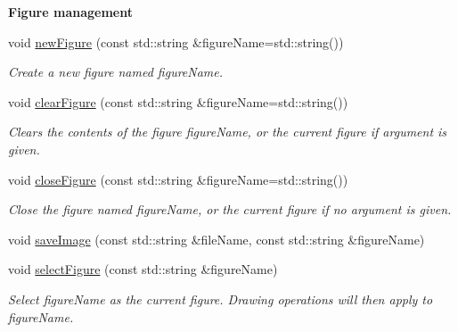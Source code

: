 \begin{Indent}\textbf{ Figure management}\par
\begin{DoxyCompactItemize}
\item 
void \hyperlink{group__figure_ga70a27a814768ac217e8323cb887f29a4}{new\+Figure} (const std\+::string \&figure\+Name=std\+::string())
\begin{DoxyCompactList}\small\item\em Create a new figure named {\itshape figure\+Name}. \end{DoxyCompactList}\item 
void \hyperlink{group__figure_ga4ff3b03be962d7ceba1062def0f557ef}{clear\+Figure} (const std\+::string \&figure\+Name=std\+::string())
\begin{DoxyCompactList}\small\item\em Clears the contents of the figure {\itshape figure\+Name}, or the current figure if argument is given. \end{DoxyCompactList}\item 
void \hyperlink{group__figure_gaa4bf32f16605010080edaea2437abb57}{close\+Figure} (const std\+::string \&figure\+Name=std\+::string())
\begin{DoxyCompactList}\small\item\em Close the figure named {\itshape figure\+Name}, or the current figure if no argument is given. \end{DoxyCompactList}\item 
void \hyperlink{group__figure_gab6e221be3af71ea2286aecd0f7768908}{save\+Image} (const std\+::string \&file\+Name, const std\+::string \&figure\+Name)
\item 
void \hyperlink{group__figure_ga026c22d6f3ab562e6ddc2859da683170}{select\+Figure} (const std\+::string \&figure\+Name)
\begin{DoxyCompactList}\small\item\em Select {\itshape figure\+Name} as the current figure. Drawing operations will then apply to {\itshape figure\+Name}. \end{DoxyCompactList}\end{DoxyCompactItemize}
\end{Indent}
